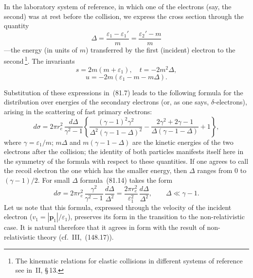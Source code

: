 In the laboratory system of reference, in which one of the electrons (say, the second) was at rest before the collision, we express the cross section through the quantity
\begin{equation}
\Delta = \frac{\varepsilon_1 - \varepsilon_1'}{m} = \frac{\varepsilon_2' - m}{m}
\tag{81.12}
\end{equation}
---the energy (in units of $m$) transferred by the first (incident) electron to the second\,\footnote{The kinematic relations for elastic collisions in different systems of reference see in~II, \S\,13.}. The invariants
\begin{equation}
s = 2m(m + \varepsilon_1),\quad t = -2m^2\Delta,
\tag{81.13}
\end{equation}
\[
u = -2m(\varepsilon_1 - m - m\Delta).
\]

Substitution of these expressions in~(81.7) leads to the following formula for the distribution over energies of the secondary electrons (or, as one says, $\delta$-electrons), arising in the scattering of fast primary electrons:
\begin{equation}
d\sigma = 2\pi r_e^2\,\frac{d\Delta}{\gamma^2-1}\left\{\frac{(\gamma-1)^2\gamma^2}{\Delta^2(\gamma-1-\Delta)^2} - \frac{2\gamma^2+2\gamma-1}{\Delta(\gamma-1-\Delta)} + 1\right\},
\tag{81.14}
\end{equation}
where $\gamma = \varepsilon_1/m$; $m\Delta$ and $m(\gamma - 1 - \Delta)$ are the kinetic energies of the two electrons after the collision; the identity of both particles manifests itself here in the symmetry of the formula with respect to these quantities. If one agrees to call the recoil electron the one which has the smaller energy, then $\Delta$ ranges from $0$ to $(\gamma-1)/2$. For small $\Delta$ formula~(81.14) takes the form
\begin{equation}
d\sigma = 2\pi r_e^2\,\frac{\gamma^2}{\gamma^2 - 1}\,\frac{d\Delta}{\Delta^2} = \frac{2\pi r_e^2}{\varepsilon_1^2}\,\frac{d\Delta}{\Delta^2},\qquad \Delta \ll \gamma-1.
\tag{81.15}
\end{equation}
Let us note that this formula, expressed through the velocity of the incident electron ($v_1 = |\mathbf{p}_1|/\varepsilon_1$), preserves its form in the transition to the non-relativistic case. It is natural therefore that it agrees in form with the result of non-relativistic theory (cf.~III,~(148.17)).

